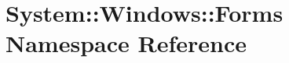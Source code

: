 \section{System::Windows::Forms Namespace Reference}
\label{namespace_system_1_1_windows_1_1_forms}


